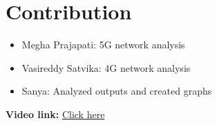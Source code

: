 \documentclass[conference]{IEEEtran}
\begin{document}
\section{Contribution}
\begin{itemize}
    \item Megha Prajapati: 5G network analysis
    \item Vasireddy Satvika: 4G network analysis
    \item Sanya: Analyzed outputs and created graphs\newline
\end{itemize}

\textbf{Video link:} \href{https://drive.google.com/drive/folders/161ArB0oiu2vUooYZYLCOMglWWCVfffRn?usp=sharing }{Click here}
\end{document}
